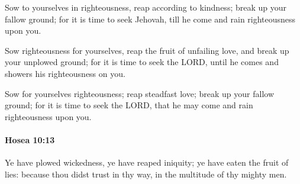 			\begin{versebox}
					\item[BHS] 
					\item[LXX] 
					\item[ASV] Sow to yourselves in righteousness, reap according to kindness; break up your fallow ground; for it is time to seek Jehovah, till he come and rain righteousness upon you.
					\item[NIV] Sow righteousness for yourselves, reap the fruit of unfailing love, and break up your unplowed ground; for it is time to seek the LORD, until he comes and showers his righteousness on you.
					\item[NRSV] Sow for yourselves righteousness; reap steadfast love; break up your fallow ground; for it is time to seek the LORD, that he may come and rain righteousness upon you.
			\end{versebox}

		\paragraph{Hosea 10:13} %
			\label{HOSEA-10-13}

			Ye have plowed wickedness, ye have reaped iniquity; ye have eaten the fruit of lies: because thou didst trust in thy way, in the multitude of thy mighty men.

